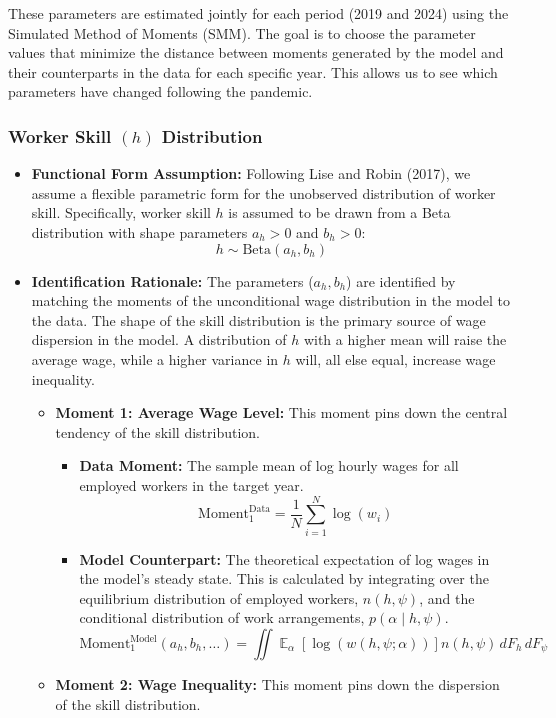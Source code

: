 \documentclass[
  11pt,
  letterpaper,
  DIV=11,
  numbers=noendperiod]{scrartcl}
\providecommand{\tightlist}{%
  \setlength{\itemsep}{0pt}\setlength{\parskip}{0pt}}\usepackage{longtable,booktabs,array}
\DeclareMathOperator*{\Exp}{\mathbb{E}} %
\begin{document}
These parameters are estimated jointly for each period (2019 and 2024)
using the Simulated Method of Moments (SMM). The goal is to choose the
parameter values that minimize the distance between moments generated by
the model and their counterparts in the data for each specific year.
This allows us to see which parameters have changed following the
pandemic.

\subsubsection{\texorpdfstring{\textbf{Worker Skill \((h)\)
Distribution}}{Worker Skill (h) Distribution}}\label{worker-skill-h-distribution}

\begin{itemize}
\item
  \textbf{Functional Form Assumption:} Following Lise and Robin (2017),
  we assume a flexible parametric form for the unobserved distribution
  of worker skill. Specifically, worker skill \(h\) is assumed to be
  drawn from a Beta distribution with shape parameters \(a_h > 0\) and
  \(b_h > 0\): \[h \sim \text{Beta}(a_h, b_h)\]
\item
  \textbf{Identification Rationale:} The parameters (\(a_h, b_h\)) are
  identified by matching the moments of the unconditional wage
  distribution in the model to the data. The shape of the skill
  distribution is the primary source of wage dispersion in the model. A
  distribution of \(h\) with a higher mean will raise the average wage,
  while a higher variance in \(h\) will, all else equal, increase wage
  inequality.

  \begin{itemize}
  \tightlist
  \item
    \textbf{Moment 1: Average Wage Level:} This moment pins down the
    central tendency of the skill distribution.

    \begin{itemize}
    \tightlist
    \item
      \textbf{Data Moment:} The sample mean of log hourly wages for all
      employed workers in the target year.
      \[\text{Moment}_1^{\text{Data}} = \frac{1}{N} \sum_{i=1}^{N} \log(w_i)\]
    \item
      \textbf{Model Counterpart:} The theoretical expectation of log
      wages in the model's steady state. This is calculated by
      integrating over the equilibrium distribution of employed workers,
      \(n(h, \psi)\), and the conditional distribution of work
      arrangements, \(p(\alpha \mid h, \psi)\).
      \[\text{Moment}_1^{\text{Model}}(a_h, b_h, \dots) = \iint \Exp_{\alpha}[\log(w(h, \psi; \alpha))] n(h, \psi) \,dF_h \,dF_\psi\]
    \end{itemize}
  \item
    \textbf{Moment 2: Wage Inequality:} This moment pins down the
    dispersion of the skill distribution.


\end{itemize}
\end{itemize}
\end{document}
